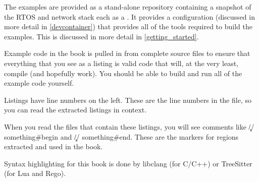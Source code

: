 The examples are provided as a stand-alone repository containing a snapshot of the RTOS and network stack each as a .
It provides a  configuration (discussed in more detail in \ref{devcontainer}) that provides all of the tools required to build the examples.
This is discussed in more detail in \ref{getting_started}.

Example code in the book is pulled in from complete source files to ensure that everything that you see as a listing is valid code that will, at the very least, compile (and hopefully work).
You should be able to build and run all of the example code yourself.

Listings have line numbers on the left.
These are the line numbers in the file, so you can read the extracted listings in context.

When you read the files that contain these listings, you will see comments like \c{// something#begin} and \c{// something#end}.
These are the markers for regions extracted and used in the book.

Syntax highlighting for this book is done by libclang (for C/C++) or TreeSitter (for Lua and Rego).
